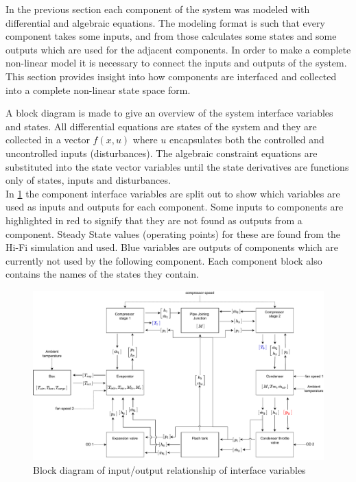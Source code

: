 In the previous section each component of the system was modeled with differential and algebraic equations. The modeling format is such that every component takes some inputs, and from those calculates some states and some outputs which are used for the adjacent components. In order to make a complete non-linear model it is necessary to connect the inputs and outputs of the system. This section provides insight into how components are interfaced and collected into a complete non-linear state space form.

A block diagram is made to give an overview of the system interface variables and states. All differential equations are states of the system and they are collected in a vector $f(x,u)$ where $u$ encapsulates both the controlled and uncontrolled inputs (disturbances). The algebraic constraint equations are substituted into the state vector variables until the state derivatives are functions only of states, inputs and disturbances.\\

In \cref{fig:Block_diagram_inout} the component interface variables are split out to show which variables are used as inputs and outputs for each component. Some inputs to components are highlighted in red to signify that they are not found as outputs from a component. Steady State values (operating points) for these are found from the Hi-Fi simulation and used. Blue variables are outputs of components which are currently not used by the following component. Each component block also contains the names of the states they contain.

\begin{figure}[h!]
	\centering
	\includegraphics[width=1\textwidth]{Graphics/Block_Diagram_inout.pdf}
	\caption{Block diagram of input/output relationship of interface variables}
	\label{fig:Block_diagram_inout}
\end{figure}


